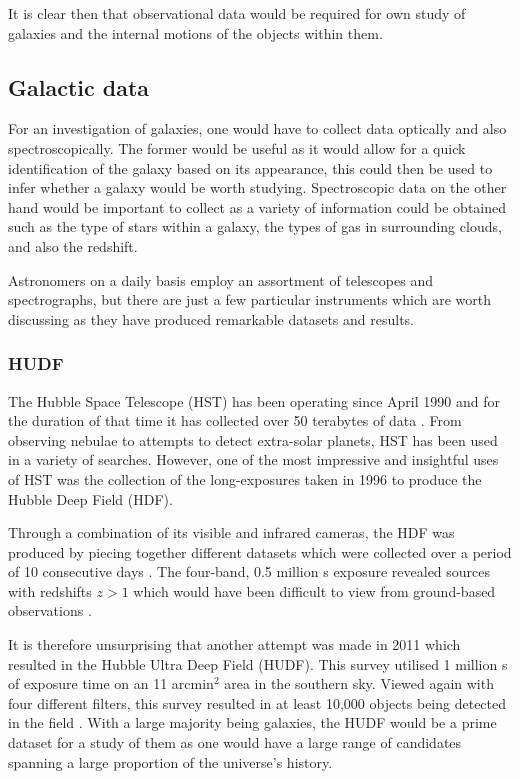 \documentclass[12pt, twocolumn]{revtex4}    %
\begin{document}
It is clear then that observational data would be required for own study of galaxies and the internal motions of the objects within them. 

\subsection{Galactic data} 

For an investigation of galaxies, one would have to collect data optically and also spectroscopically. The former would be useful as it would allow for a quick identification of the galaxy based on its appearance, this could then be used to infer whether a galaxy would be worth studying. Spectroscopic data on the other hand would be important to collect as a variety of information could be obtained such as the type of stars within a galaxy, the types of gas in surrounding clouds, and also the redshift. 

Astronomers on a daily basis employ an assortment of telescopes and spectrographs, but there are just a few particular instruments which are worth discussing as they have produced remarkable datasets and results.

\subsubsection{HUDF}

The Hubble Space Telescope (HST) has been operating since April 1990 and for the duration of that time it has collected over 50 terabytes of data \citep{mccoy_space_sciences}. From observing nebulae to attempts to detect extra-solar planets, HST has been used in a variety of searches. However, one of the most impressive and insightful uses of HST was the collection of the long-exposures taken in 1996 to produce the Hubble Deep Field (HDF). 

Through a combination of its visible and infrared cameras, the HDF was produced by piecing together different datasets which were collected over a period of 10 consecutive days \citep{mccoy_space_sciences, williams_hdp}. The four-band, 0.5 million s exposure revealed sources with redshifts $z>1$ which would have been difficult to view from ground-based observations \citep{beckwith_hudf}. 


It is therefore unsurprising that another attempt was made in 2011 which resulted in the Hubble Ultra Deep Field (HUDF). This survey utilised 1 million s of exposure time on an 11 arcmin$^2$ area in the southern sky. Viewed again with four different filters, this survey resulted in at least 10,000 objects being detected in the field \citep{beckwith_hudf}. With a large majority being galaxies, the HUDF would be a prime dataset for a study of them as one would have a large range of candidates spanning a large proportion of the universe's history. 
\end{document}
